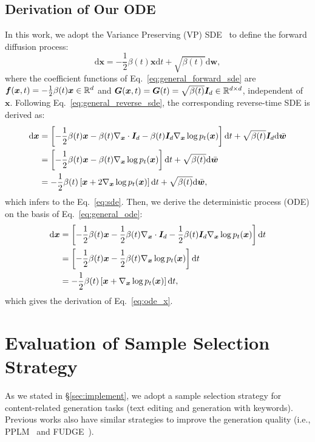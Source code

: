 \documentclass[11pt]{article}
\begin{document}
\subsection{Derivation of Our ODE}
In this work, we adopt the Variance Preserving (VP) SDE~\cite{DBLP:conf/iclr/0011SKKEP21} to define the forward diffusion process:
\begin{equation}
    \text{d} \bm x = -\frac{1}{2}\beta(t)\bm x \text{d}t+\sqrt{\beta(t)}\text{d} \bm w,
\end{equation}
where the coefficient functions of Eq.~\ref{eq:general_forward_sde} are $\bm f(\bm x,t)=-\frac{1}{2}\beta(t)\bm x\in\mathbb{R}^d$ and $\bm{G}(\bm{x},t)=\bm G(t)=\sqrt{\beta(t)}\bm I_d\in\mathbb{R}^{d\times d}$, independent of $\bm x$. Following Eq.~\ref{eq:general_reverse_sde}, the corresponding reverse-time SDE is derived as:
\begin{equation}
\begin{split}
    \text d\bm x &= \left[ -\frac{1}{2}\beta(t)\bm x - \beta(t)\nabla_{\bm x}\cdot\bm I_d - \beta(t)\bm I_d\nabla_{\bm x}\log p_t(\bm x)  \right]\text d t + \sqrt{\beta(t)}\bm I_d\text d \Bar{\bm w}\\
    & = \left[ -\frac{1}{2}\beta(t)\bm x - \beta(t)\nabla_{\bm x}\log p_t(\bm x)  \right]\text d t + \sqrt{\beta(t)}\text d \Bar{\bm w}\\
    &= -\frac{1}{2}\beta(t)\left[\bm x + 2\nabla_{\bm x}\log p_t(\bm x) \right]\text d t + \sqrt{\beta(t)}\text d \Bar{\bm w},
\end{split}
\end{equation}
which infers to the Eq.~\ref{eq:sde}. Then, we derive the deterministic process (ODE) on the basis of Eq.~\ref{eq:general_ode}:
\begin{equation}
    \begin{split}
        \text d\bm x &= \left[ -\frac{1}{2}\beta(t)\bm x -\frac{1}{2}\beta(t)\nabla_{\bm x}\cdot\bm I_d-\frac{1}{2}\beta(t)\bm I_d\nabla_{\bm x}\log p_t(\bm x) \right]\text d t\\
        &=\left[ -\frac{1}{2}\beta(t)\bm x -\frac{1}{2}\beta(t)\nabla_{\bm x}\log p_t(\bm x) \right]\text d t\\
        &=-\frac{1}{2}\beta(t)\left[\bm x +\nabla_{\bm x}\log p_t(\bm x) \right]\text d t,
    \end{split}
\end{equation}
which gives the derivation of Eq.~\ref{eq:ode_x}.
\newpage
\section{Evaluation of Sample Selection Strategy}
\label{app:sample_selection}
As we stated in \S\ref{sec:implement}, we adopt a sample selection strategy for content-related generation tasks (text editing and generation with keywords).
Previous works also have similar strategies to improve the generation quality (i.e., PPLM~\cite{Dathathri2020Plug} and FUDGE~\cite{DBLP:journals/corr/abs-2104-05218}).
\end{document}
